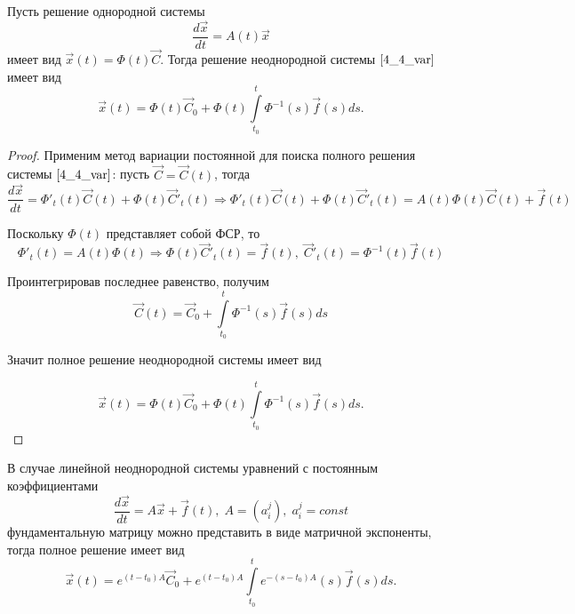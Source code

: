 \begin{theorem}
  Пусть решение однородной системы
  \begin{equation*}
    \frac{d \overrightarrow x}{dt} = A(t) \overrightarrow x
  \end{equation*}
  имеет вид $\overrightarrow{x}(t) = \varPhi(t) \overrightarrow C$. Тогда решение неоднородной системы $\eqref{4_4_var}$ имеет вид
  \begin{equation*}
    \overrightarrow x(t) = \varPhi(t) \overrightarrow C_0 + \varPhi(t) \int \limits_{t_0}^t \varPhi^{-1}(s) \overrightarrow{f}(s) ds.
  \end{equation*}
\end{theorem}
\begin{proof}
  Применим метод вариации постоянной для поиска полного решения системы $\eqref{4_4_var}$: пусть $\overrightarrow C = \overrightarrow C(t)$, тогда
  \begin{equation*}
    \frac{d \overrightarrow x}{dt} = \varPhi'_t (t) \overrightarrow C(t) + \varPhi(t) \overrightarrow C'_t (t) \Rightarrow \varPhi'_t (t) \overrightarrow C(t) + \varPhi (t) \overrightarrow C'_t (t) = A(t) \varPhi(t) \overrightarrow C(t) + \overrightarrow{f}(t)
  \end{equation*}

  Поскольку $\varPhi(t)$ представляет собой ФСР, то 
  \begin{equation*}
    \varPhi'_t (t) = A(t) \varPhi(t) \Rightarrow \varPhi(t) \overrightarrow C'_t (t) = \overrightarrow{f}(t), \; \overrightarrow C'_t (t) = \varPhi^{-1}(t) \overrightarrow{f}(t)
  \end{equation*}

  Проинтегрировав последнее равенство, получим
  \begin{equation*}
    \overrightarrow C(t) = \overrightarrow C_0 + \int \limits_{t_0}^t \varPhi^{-1}(s) \overrightarrow{f}(s) ds
  \end{equation*}

  Значит полное решение неоднородной системы имеет вид

  \begin{equation*}
    \overrightarrow x(t) = \varPhi(t) \overrightarrow C_0 + \varPhi(t) \int \limits_{t_0}^t \varPhi^{-1}(s) \overrightarrow{f}(s) ds.
  \end{equation*}

\end{proof}

\begin{remark}
  В случае линейной неоднородной системы уравнений с постоянным коэффициентами 
  \begin{equation*}
    \frac{d \overrightarrow x}{dt} = A \overrightarrow x + \overrightarrow{f}(t), \; A = (a_i^j), \; a_i^j = const
  \end{equation*}
  фундаментальную матрицу можно представить в виде матричной экспоненты, тогда полное решение имеет вид
  \begin{equation*}
    \overrightarrow x(t) = e^{(t - t_0)A} \overrightarrow C_0 + e^{(t - t_0)A} \int \limits_{t_0}^t e^{-(s - t_0)A}(s) \overrightarrow{f}(s) ds.
  \end{equation*}
\end{remark}

